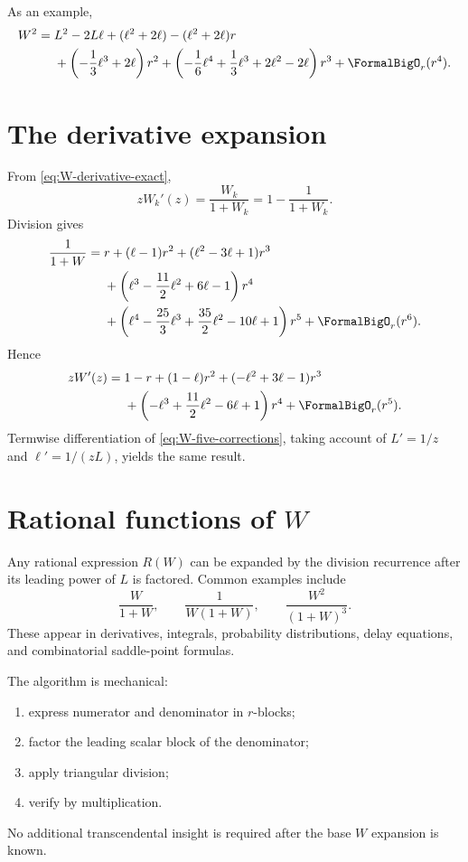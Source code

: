 \documentclass[11pt,openany]{book}
\theoremstyle{definition}
\theoremstyle{plain}
\theoremstyle{remark}
\begin{document}
As an example,
\begin{align}
 W^2={}&L^2-2L\ell+(\ell^2+2\ell)
 -(\ell^2+2\ell)r\notag\\
 &+\left(-\frac13\ell^3+2\ell\right)r^2
 +\left(-\frac16\ell^4+\frac13\ell^3+2\ell^2-2\ell\right)r^3
 +\FormalBigO_r(r^4).
\label{eq:W-square}
\end{align}

\section{The derivative expansion}
From \cref{eq:W-derivative-exact},
\begin{equation}\label{eq:zWprime}
 zW_k'(z)=\frac{W_k}{1+W_k}=1-\frac1{1+W_k}.
\end{equation}
Division gives
\begin{align}
 \frac1{1+W}={}&r+(\ell-1)r^2+(\ell^2-3\ell+1)r^3\notag\\
 &+\left(\ell^3-\frac{11}{2}\ell^2+6\ell-1\right)r^4\notag\\
 &+\left(\ell^4-\frac{25}{3}\ell^3+\frac{35}{2}\ell^2-10\ell+1\right)r^5
 +\FormalBigO_r(r^6).
\label{eq:one-over-oneplusW}
\end{align}
Hence
\begin{align}
 zW'(z)={}&1-r+(1-\ell)r^2
 +(-\ell^2+3\ell-1)r^3\notag\\
 &+\left(-\ell^3+\frac{11}{2}\ell^2-6\ell+1\right)r^4
 +\FormalBigO_r(r^5).
\label{eq:Wprime-series}
\end{align}
Termwise differentiation of \cref{eq:W-five-corrections}, taking account of \(L'=1/z\) and \(\ell'=1/(zL)\), yields the same result.

\section{Rational functions of \texorpdfstring{\(W\)}{W}}
Any rational expression \(R(W)\) can be expanded by the division recurrence after its leading power of \(L\) is factored. Common examples include
\[
 \frac{W}{1+W},
 \qquad
 \frac1{W(1+W)},
 \qquad
 \frac{W^2}{(1+W)^3}.
\]
These appear in derivatives, integrals, probability distributions, delay equations, and combinatorial saddle-point formulas.

The algorithm is mechanical:
\begin{enumerate}
\item express numerator and denominator in \(r\)-blocks;
\item factor the leading scalar block of the denominator;
\item apply triangular division;
\item verify by multiplication.
\end{enumerate}
No additional transcendental insight is required after the base \(W\) expansion is known.
\end{document}
